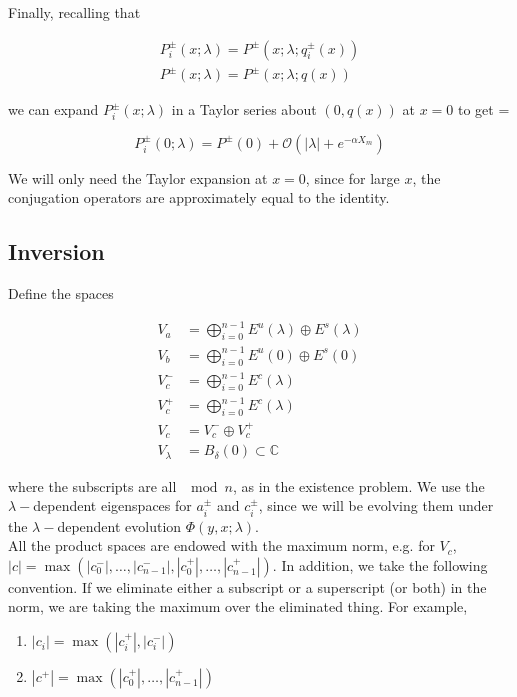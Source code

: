 \documentclass[12pt]{article}
\def\C{{\mathbb C}}
\begin{document}
Finally, recalling that

\begin{align*}
P_i^\pm(x; \lambda) = P^\pm(x; \lambda; q_i^\pm(x)) \\
P^\pm(x; \lambda) = P^\pm(x; \lambda; q(x))
\end{align*}

we can expand $P_i^\pm(x; \lambda)$ in a Taylor series about $(0, q(x))$ at $x = 0$ to get =

\begin{equation}\label{PTaylor}
P_i^\pm(0; \lambda) = P^\pm(0) + \mathcal{O}(|\lambda| + e^{-\alpha X_m})
\end{equation}

We will only need the Taylor expansion at $x = 0$, since for large $x$, the conjugation operators are approximately equal to the identity.

\subsection{Inversion}

Define the spaces

\begin{align*}
V_a &= \bigoplus_{i=0}^{n-1} E^u(\lambda) \oplus E^s(\lambda) \\
V_b &= \bigoplus_{i=0}^{n-1} E^u(0) \oplus E^s(0) \\
V_c^- &= \bigoplus_{i=0}^{n-1} E^c(\lambda) \\
V_c^+ &= \bigoplus_{i=0}^{n-1} E^c(\lambda) \\
V_c &= V_c^- \oplus V_c^+ \\
V_\lambda &= B_\delta(0) \subset \C
\end{align*}

where the subscripts are all $\mod n$, as in the existence problem. We use the $\lambda-$dependent eigenspaces for $a_i^\pm$ and $c_i^\pm$, since we will be evolving them under the $\lambda-$dependent evolution $\Phi(y, x; \lambda)$.\\

All the product spaces are endowed with the maximum norm, e.g. for $V_c$, $|c| = \max(|c_0^-|, \dots, |c_{n-1}^-|, |c_0^+|, \dots, |c_{n-1}^+|)$. In addition, we take the following convention. If we eliminate either a subscript or a superscript (or both) in the norm, we are taking the maximum over the eliminated thing. For example,

\begin{enumerate}
	\item $|c_i| = \max(|c_i^+|, |c_i^-|)$ 
	\item $|c^+| = \max(|c_0^+|, \dots, |c_{n-1}^+|)$
\end{enumerate}
\end{document}
